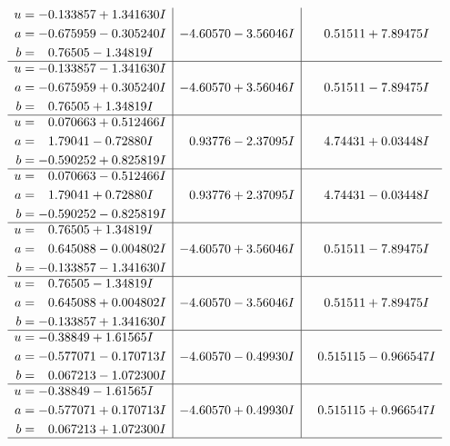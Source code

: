 \documentclass[1p]{elsarticle_modified}
\theoremstyle{definition}
\begin{document}
$$\begin{array}{c|c|c}
\begin{aligned}
u &= -0.133857 + 1.341630 I \\
a &= -0.675959 - 0.305240 I \\
b &= \phantom{-}0.76505 - 1.34819 I\end{aligned}
 & -4.60570 - 3.56046 I & \phantom{-}0.51511 + 7.89475 I \\ \hline\begin{aligned}
u &= -0.133857 - 1.341630 I \\
a &= -0.675959 + 0.305240 I \\
b &= \phantom{-}0.76505 + 1.34819 I\end{aligned}
 & -4.60570 + 3.56046 I & \phantom{-}0.51511 - 7.89475 I \\ \hline\begin{aligned}
u &= \phantom{-}0.070663 + 0.512466 I \\
a &= \phantom{-}1.79041 - 0.72880 I \\
b &= -0.590252 + 0.825819 I\end{aligned}
 & \phantom{-}0.93776 - 2.37095 I & \phantom{-}4.74431 + 0.03448 I \\ \hline\begin{aligned}
u &= \phantom{-}0.070663 - 0.512466 I \\
a &= \phantom{-}1.79041 + 0.72880 I \\
b &= -0.590252 - 0.825819 I\end{aligned}
 & \phantom{-}0.93776 + 2.37095 I & \phantom{-}4.74431 - 0.03448 I \\ \hline\begin{aligned}
u &= \phantom{-}0.76505 + 1.34819 I \\
a &= \phantom{-}0.645088 - 0.004802 I \\
b &= -0.133857 - 1.341630 I\end{aligned}
 & -4.60570 + 3.56046 I & \phantom{-}0.51511 - 7.89475 I \\ \hline\begin{aligned}
u &= \phantom{-}0.76505 - 1.34819 I \\
a &= \phantom{-}0.645088 + 0.004802 I \\
b &= -0.133857 + 1.341630 I\end{aligned}
 & -4.60570 - 3.56046 I & \phantom{-}0.51511 + 7.89475 I \\ \hline\begin{aligned}
u &= -0.38849 + 1.61565 I \\
a &= -0.577071 - 0.170713 I \\
b &= \phantom{-}0.067213 - 1.072300 I\end{aligned}
 & -4.60570 - 0.49930 I & \phantom{-}0.515115 - 0.966547 I \\ \hline\begin{aligned}
u &= -0.38849 - 1.61565 I \\
a &= -0.577071 + 0.170713 I \\
b &= \phantom{-}0.067213 + 1.072300 I\end{aligned}
 & -4.60570 + 0.49930 I & \phantom{-}0.515115 + 0.966547 I\\
 \hline 
 \end{array}$$\newpage\newpage\renewcommand{\arraystretch}{1}
\end{document}
